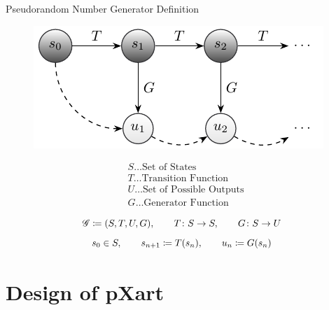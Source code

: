 \documentclass[aspectratio=169]{beamer}
\begin{document}
    \begin{frame}{Pseudorandom Number Generator Definition}
      \begin{minipage}[c]{0.49\textwidth}
        \begin{figure}
          \includegraphics[width=\textwidth]{figures/sequence_generation_scheme.pdf}
        \end{figure}
      \end{minipage}
      \begin{minipage}[c]{0.49\textwidth}
        \begin{align*}
          &S\ldots\text{Set of States}\\
          &T\ldots\text{Transition Function} \\
          &U\ldots\text{Set of Possible Outputs} \\
          &G\ldots\text{Generator Function}
        \end{align*}
      \end{minipage}
      \vfill
      \begin{mybox}
        \[
          \mathscr{G} \coloneqq (S,T,U,G),\qquad T\colon S\to S, \qquad G\colon S\to U
        \]
        \[
          s_0\in S, \qquad s_{n+1} \coloneqq T(s_n), \qquad u_n \coloneqq G(s_n)
        \]
      \end{mybox}
    \end{frame}

  \section{Design of pXart} %
  \label{sec:design}
\end{document}

